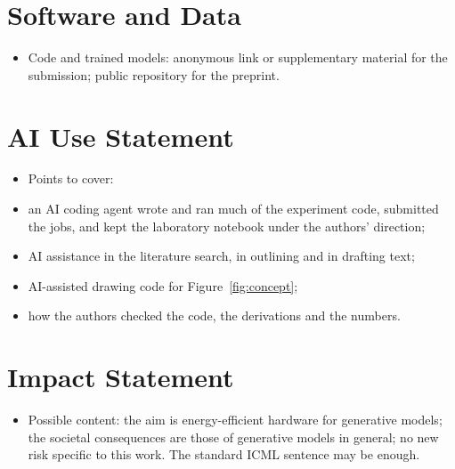 \documentclass{article}
\newif\ifpreprintversion
\newif\ifshownotes
\newenvironment{plan}
  {\begin{itemize}[leftmargin=1.1em,itemsep=1pt,topsep=2pt,parsep=0pt]\color{plancolor}}
  {\end{itemize}}
\newcommand{\todo}[1]{\ifshownotes\textcolor{tbdcolor}{[TODO: #1]}\fi}
\begin{document}

\section*{Software and Data}
\begin{plan}
  \item Code and trained models: anonymous link or supplementary material for
        the submission; public repository for the preprint.
\end{plan}

\ifpreprintversion
\section*{Acknowledgements}
\begin{plan}
  \item Funding, computing resources, discussions. Not in the anonymous version.
\end{plan}
\fi

\section*{AI Use Statement}
\begin{plan}
  \item \todo{write this statement; authors are responsible for all content.}
        Points to cover:
  \item an AI coding agent wrote and ran much of the experiment code, submitted
        the jobs, and kept the laboratory notebook under the authors' direction;
  \item AI assistance in the literature search, in outlining and in drafting
        text;
  \item AI-assisted drawing code for Figure~\ref{fig:concept};
  \item how the authors checked the code, the derivations and the numbers.
\end{plan}

\section*{Impact Statement}
\begin{plan}
  \item \todo{write.} Possible content: the aim is energy-efficient hardware
        for generative models; the societal consequences are those of
        generative models in general; no new risk specific to this work. The
        standard ICML sentence may be enough.
\end{plan}
\end{document}
